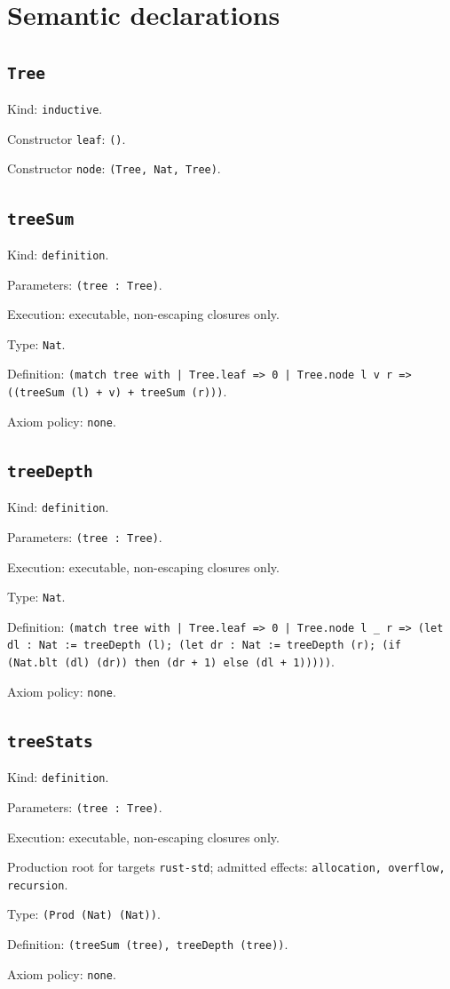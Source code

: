 \documentclass[11pt]{article}
\begin{document}
\section*{Semantic declarations}
\subsection*{\texttt{Tree}}
\noindent Kind: \texttt{inductive}.\par
\noindent Constructor \texttt{leaf}: \texttt{()}.\par
\noindent Constructor \texttt{node}: \texttt{(Tree, Nat, Tree)}.\par
\subsection*{\texttt{treeSum}}
\noindent Kind: \texttt{definition}.\par
\noindent Parameters: \texttt{(tree : Tree)}.\par
\noindent Execution: executable, non-escaping closures only.\par
\noindent Type: \texttt{Nat}.\par
\noindent Definition: \texttt{(match tree with | Tree.leaf => 0 | Tree.node l v r => ((treeSum (l) + v) + treeSum (r)))}.\par
\noindent Axiom policy: \texttt{none}.\par
\subsection*{\texttt{treeDepth}}
\noindent Kind: \texttt{definition}.\par
\noindent Parameters: \texttt{(tree : Tree)}.\par
\noindent Execution: executable, non-escaping closures only.\par
\noindent Type: \texttt{Nat}.\par
\noindent Definition: \texttt{(match tree with | Tree.leaf => 0 | Tree.node l \_ r => (let dl : Nat := treeDepth (l); (let dr : Nat := treeDepth (r); (if (Nat.blt (dl) (dr)) then (dr + 1) else (dl + 1)))))}.\par
\noindent Axiom policy: \texttt{none}.\par
\subsection*{\texttt{treeStats}}
\noindent Kind: \texttt{definition}.\par
\noindent Parameters: \texttt{(tree : Tree)}.\par
\noindent Execution: executable, non-escaping closures only.\par
\noindent Production root for targets \texttt{rust-std}; admitted effects: \texttt{allocation, overflow, recursion}.\par
\noindent Type: \texttt{(Prod (Nat) (Nat))}.\par
\noindent Definition: \texttt{(treeSum (tree), treeDepth (tree))}.\par
\noindent Axiom policy: \texttt{none}.\par
\end{document}
